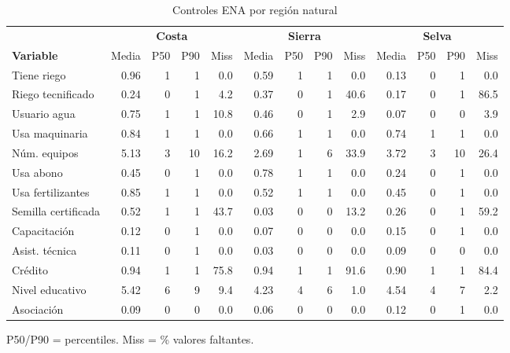 \documentclass[10pt,a4paper]{article}
\begin{document}
\newpage
\begin{landscape}
\begin{table}[H]
\centering
\caption{Controles ENA por región natural}
\label{tab:ena_controls_region}
\begin{threeparttable}
\footnotesize
\begin{tabular}{lrrrrrrrrrrrr}
\toprule
& \multicolumn{4}{c}{\textbf{Costa}} & \multicolumn{4}{c}{\textbf{Sierra}} & \multicolumn{4}{c}{\textbf{Selva}} \\
\cmidrule(lr){2-5} \cmidrule(lr){6-9} \cmidrule(lr){10-13}
\textbf{Variable} & Media & P50 & P90 & Miss & Media & P50 & P90 & Miss & Media & P50 & P90 & Miss \\
\midrule
Tiene riego & 0.96 & 1 & 1 & 0.0 & 0.59 & 1 & 1 & 0.0 & 0.13 & 0 & 1 & 0.0 \\
Riego tecnificado & 0.24 & 0 & 1 & 4.2 & 0.37 & 0 & 1 & 40.6 & 0.17 & 0 & 1 & 86.5 \\
Usuario agua & 0.75 & 1 & 1 & 10.8 & 0.46 & 0 & 1 & 2.9 & 0.07 & 0 & 0 & 3.9 \\
Usa maquinaria & 0.84 & 1 & 1 & 0.0 & 0.66 & 1 & 1 & 0.0 & 0.74 & 1 & 1 & 0.0 \\
Núm. equipos & 5.13 & 3 & 10 & 16.2 & 2.69 & 1 & 6 & 33.9 & 3.72 & 3 & 10 & 26.4 \\
Usa abono & 0.45 & 0 & 1 & 0.0 & 0.78 & 1 & 1 & 0.0 & 0.24 & 0 & 1 & 0.0 \\
Usa fertilizantes & 0.85 & 1 & 1 & 0.0 & 0.52 & 1 & 1 & 0.0 & 0.45 & 0 & 1 & 0.0 \\
Semilla certificada & 0.52 & 1 & 1 & 43.7 & 0.03 & 0 & 0 & 13.2 & 0.26 & 0 & 1 & 59.2 \\
Capacitación & 0.12 & 0 & 1 & 0.0 & 0.07 & 0 & 0 & 0.0 & 0.15 & 0 & 1 & 0.0 \\
Asist. técnica & 0.11 & 0 & 1 & 0.0 & 0.03 & 0 & 0 & 0.0 & 0.09 & 0 & 0 & 0.0 \\
Crédito & 0.94 & 1 & 1 & 75.8 & 0.94 & 1 & 1 & 91.6 & 0.90 & 1 & 1 & 84.4 \\
Nivel educativo & 5.42 & 6 & 9 & 9.4 & 4.23 & 4 & 6 & 1.0 & 4.54 & 4 & 7 & 2.2 \\
Asociación & 0.09 & 0 & 0 & 0.0 & 0.06 & 0 & 0 & 0.0 & 0.12 & 0 & 1 & 0.0 \\
\bottomrule
\end{tabular}
\begin{tablenotes}
\footnotesize
\item P50/P90 = percentiles. Miss = \% valores faltantes.
\end{tablenotes}
\end{threeparttable}
\end{table}
\end{landscape}
\end{document}

